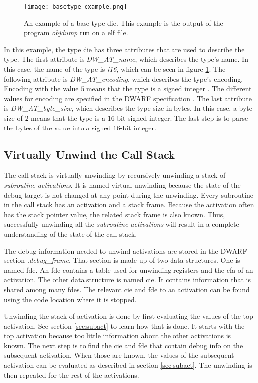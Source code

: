 \begin{figure}[h]
	\centering
	\texttt{[image: basetype-example.png]}
	\caption{An example of a base type \gls{die}. This example is the output of the program \emph{objdump} run on a \gls{elf} file.}
	\label{fig:basetypeexample}
\end{figure}


In this example, the type \gls{die} has three attributes that are used to describe the type.
The first attribute is \emph{DW\_AT\_name}, which describes the type's name.
In this case, the name of the type is \emph{i16}, which can be seen in figure \ref{fig:basetypeexample}.
The following attribute is \emph{DW\_AT\_encoding}, which describes the type's encoding.
Encoding with the value $5$ means that the type is a signed integer \cite{dwarf}.
The different values for encoding are specified in the \gls{DWARF} specification \cite{dwarf}.
The last attribute is \emph{DW\_AT\_byte\_size}, which describes the type size in bytes.
In this case, a byte size of $2$ means that the type is a $16$-bit signed integer.
The last step is to parse the bytes of the value into a signed $16$-bit integer.


\subsection{Virtually Unwind the Call Stack}
\label{sec:stacktrace}
The call stack is virtually unwinding by recursively unwinding a stack of \emph{subroutine activations}.
It is named virtual unwinding because the state of the debug target is not changed at any point during the unwinding.
Every subroutine in the call stack has an activation and a stack frame.
Because the activation often has the stack pointer value, the related stack frame is also known.
Thus, successfully unwinding all the \emph{subroutine activations} will result in a complete understanding of the state of the call stack.


The debug information needed to unwind activations are stored in the \gls{DWARF} section \emph{.debug\_frame}.
That section is made up of two data structures.
One is named \gls{fde}.
An \gls{fde} contains a table used for unwinding registers and the \gls{cfa} of an activation.
The other data structure is named \gls{cie}.
It contains information that is shared among many \glspl{fde}.
The relevant \gls{cie} and \gls{fde} to an activation can be found using the code location where it is stopped.


Unwinding the stack of activation is done by first evaluating the values of the top activation.
See section \ref{sec:subact} to learn how that is done.
It starts with the top activation because too little information about the other activations is known.
The next step is to find the \gls{cie} and \gls{fde} that contain debug info on the subsequent activation.
When those are known, the values of the subsequent activation can be evaluated as described in section \ref{sec:subact}.
The unwinding is then repeated for the rest of the activations.


